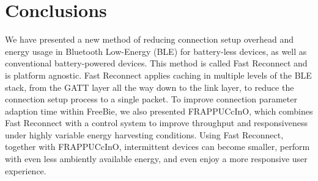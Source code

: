 \chapter{Conclusions}
\label{chp:conclusions}

We have presented a new method of reducing connection setup overhead and energy usage in Bluetooth Low-Energy (BLE) for battery-less devices, as well as conventional battery-powered devices. This method is called Fast Reconnect and is platform agnostic. Fast Reconnect applies caching in multiple levels of the BLE stack, from the GATT layer all the way down to the link layer, to reduce the connection setup process to a single packet. To improve connection parameter adaption time within FreeBie, we also presented FRAPPUCcInO, which combines Fast Reconnect with a control system to improve throughput and responsiveness under highly variable energy harvesting conditions. Using Fast Reconnect, together with FRAPPUCcInO, intermittent devices can become smaller, perform with even less ambiently available energy, and even enjoy a more responsive user experience.
